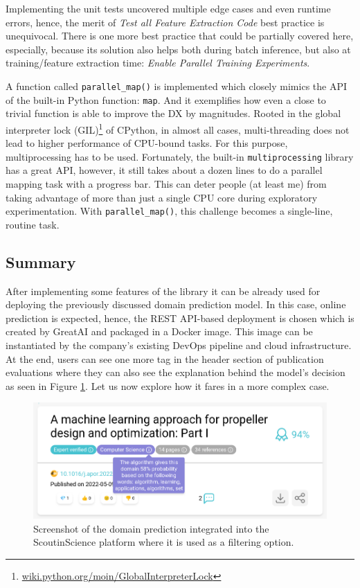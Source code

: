 Implementing the unit tests uncovered multiple edge cases and even runtime errors, hence, the merit of \textit{Test all Feature Extraction Code} best practice is unequivocal. There is one more best practice that could be partially covered here, especially, because its solution also helps both during batch inference, but also at training/feature extraction time: \textit{Enable Parallel Training Experiments}.

A function called \texttt{parallel\_map()} is implemented which closely mimics the API of the built-in Python function: \texttt{map}. And it exemplifies how even a close to trivial function is able to improve the DX by magnitudes. Rooted in the global interpreter lock (GIL)\footnote{\href{https://wiki.python.org/moin/GlobalInterpreterLock}{wiki.python.org/moin/GlobalInterpreterLock}} of CPython, in almost all cases, multi-threading does not lead to higher performance of CPU-bound tasks. For this purpose, multiprocessing has to be used. Fortunately, the built-in \texttt{multiprocessing} library has a great API, however, it still takes about a dozen lines to do a parallel mapping task with a progress bar. This can deter people (at least me) from taking advantage of more than just a single CPU core during exploratory experimentation. With \texttt{parallel\_map()}, this challenge becomes a single-line, routine task. 

\subsection{Summary}

After implementing some features of the library it can be already used for deploying the previously discussed domain prediction model. In this case, online prediction is expected, hence, the REST API-based deployment is chosen which is created by GreatAI and packaged in a Docker image. This image can be instantiated by the company's existing DevOps pipeline and cloud infrastructure. At the end, users can see one more tag in the header section of publication evaluations where they can also see the explanation behind the model's decision as seen in Figure \ref{fig:dashboard-domains}. Let us now explore how it fares in a more complex case.

\begin{figure}
    \centering
    \includegraphics[width=0.7\linewidth]{figures/dashboard-domains.png}
    \caption{Screenshot of the domain prediction integrated into the ScoutinScience platform where it is used as a filtering option.}
    \label{fig:dashboard-domains}
\end{figure}
